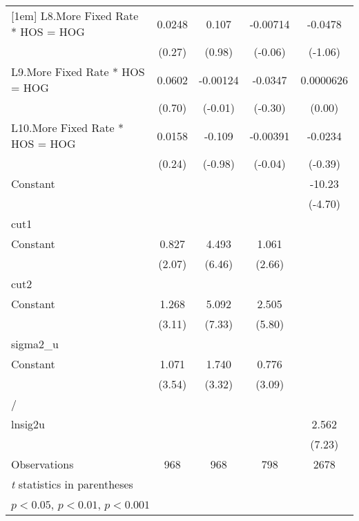 {\begin{tabular}{l*{4}{c}}
[1em]
L8.More Fixed Rate * HOS = HOG&   0.0248         &    0.107         & -0.00714         &  -0.0478         \\
                &   (0.27)         &   (0.98)         &  (-0.06)         &  (-1.06)         \\
[1em]
L9.More Fixed Rate * HOS = HOG&   0.0602         & -0.00124         &  -0.0347         &0.0000626         \\
                &   (0.70)         &  (-0.01)         &  (-0.30)         &   (0.00)         \\
[1em]
L10.More Fixed Rate * HOS = HOG&   0.0158         &   -0.109         & -0.00391         &  -0.0234         \\
                &   (0.24)         &  (-0.98)         &  (-0.04)         &  (-0.39)         \\
[1em]
Constant        &                  &                  &                  &   -10.23\sym{***}\\
                &                  &                  &                  &  (-4.70)         \\
\hline
cut1            &                  &                  &                  &                  \\
Constant        &    0.827\sym{*}  &    4.493\sym{***}&    1.061\sym{**} &                  \\
                &   (2.07)         &   (6.46)         &   (2.66)         &                  \\
\hline
cut2            &                  &                  &                  &                  \\
Constant        &    1.268\sym{**} &    5.092\sym{***}&    2.505\sym{***}&                  \\
                &   (3.11)         &   (7.33)         &   (5.80)         &                  \\
\hline
sigma2\_u        &                  &                  &                  &                  \\
Constant        &    1.071\sym{***}&    1.740\sym{***}&    0.776\sym{**} &                  \\
                &   (3.54)         &   (3.32)         &   (3.09)         &                  \\
\hline
/               &                  &                  &                  &                  \\
lnsig2u         &                  &                  &                  &    2.562\sym{***}\\
                &                  &                  &                  &   (7.23)         \\
\hline
Observations    &      968         &      968         &      798         &     2678         \\
\hline\hline
\multicolumn{5}{l}{\footnotesize \textit{t} statistics in parentheses}\\
\multicolumn{5}{l}{\footnotesize \sym{*} \(p<0.05\), \sym{**} \(p<0.01\), \sym{***} \(p<0.001\)}\\
\end{tabular}
}
